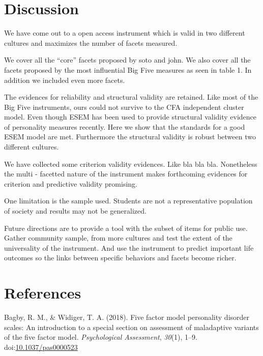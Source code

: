 \documentclass[,man,floatsintext]{apa6}
\theoremstyle{definition}
\theoremstyle{definition}
\theoremstyle{definition}
\theoremstyle{remark}
\begin{document}
\hypertarget{discussion}{%
\section{Discussion}\label{discussion}}

We have come out to a open access instrument which is valid in two
different cultures and maximizes the number of facets measured.

We cover all the \enquote{core} facets proposed by soto and john. We
also cover all the facets proposed by the most influential Big Five
measures as seen in table 1. In addition we included even more facets.

The evidences for reliability and structural validity are retained. Like
most of the Big Five instruments, ours could not survive to the CFA
independent cluster model. Even though ESEM has been used to provide
structural validity evidence of personality measures recently. Here we
show that the standards for a good ESEM model are met. Furthermore the
structural validity is robust between two different cultures.

We have collected some criterion validity evidences. Like bla bla bla.
Nonetheless the multi - facetted nature of the instrument makes
forthcoming evidences for criterion and predictive validity promising.

One limitation is the sample used. Students are not a representative
population of society and results may not be generalized.

Future directions are to provide a tool with the subset of items for
public use. Gather community sample, from more cultures and test the
extent of the universality of the instrument. And use the instrument to
predict important life outcomes so the links between specific behaviors
and facets become richer.

\newpage

\hypertarget{references}{%
\section{References}\label{references}}

\begingroup
\setlength{\parindent}{-0.5in}
\setlength{\leftskip}{0.5in}

\hypertarget{refs}{}
\leavevmode\hypertarget{ref-Bagby2018}{}%
Bagby, R. M., \& Widiger, T. A. (2018). Five factor model personality
disorder scales: An introduction to a special section on assessment of
maladaptive variants of the five factor model. \emph{Psychological
Assessment}, \emph{30}(1), 1--9.
doi:\href{https://doi.org/10.1037/pas0000523}{10.1037/pas0000523}
\end{document}
